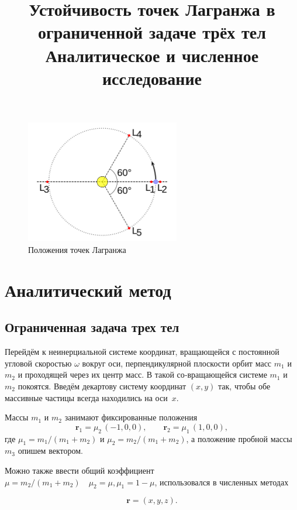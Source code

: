 \documentclass[12pt]{article}
\title{Устойчивость точек Лагранжа в ограниченной задаче трёх тел\\\small Аналитическое и численное исследование}
\author{}
\date{}
\newcommand{\rvec}{\mathbf r}
\newcommand{\rone}{\mathbf r_1}
\newcommand{\rtwo}{\mathbf r_2}
\newcommand{\muone}{\mu_1}
\newcommand{\mutwo}{\mu_2}
\begin{document}
\maketitle
\tableofcontents
\bigskip

\begin{figure}[H]
  \centering
  \includegraphics[width=0.6\textwidth]{image.png}
  \caption{Положения точек Лагранжа}
  \label{fig:lagr}
\end{figure}

\section{Аналитический метод}
\subsection{Ограниченная задача трех тел}\label{sec:corot}

Перейдём к неинерциальной системе координат, вращающейся с постоянной угловой скоростью $\omega$ вокруг оси, перпендикулярной плоскости орбит масс $m_1$ и $m_2$ и проходящей через их центр масс. В такой со‑вращающейся системе $m_1$ и $m_2$ покоятся. Введём декартову систему координат $(x,y)$ так, чтобы обе массивные частицы всегда находились на оси~$x$.

Массы $m_1$ и $m_2$ занимают фиксированные положения
\begin{equation}\label{eq:1}
  \rone = \mutwo\,(-1,0,0),\qquad
  \rtwo = \muone\,(1,0,0),
\end{equation}
где $\mu_1=m_1/(m_1+m_2)$ и $\mu_2=m_2/(m_1+m_2)$, а положение пробной массы $m_3$ опишем вектором. 

Можно также ввести общий коэффициент $ \mu=m_2/(m_1+m_2) \quad \mu_2 = \mu, \mu_1 = 1 - \mu$, использовался в численных методах

\begin{equation}\label{eq:2}
  \rvec = (x,y,z).
\end{equation}
\end{document}
